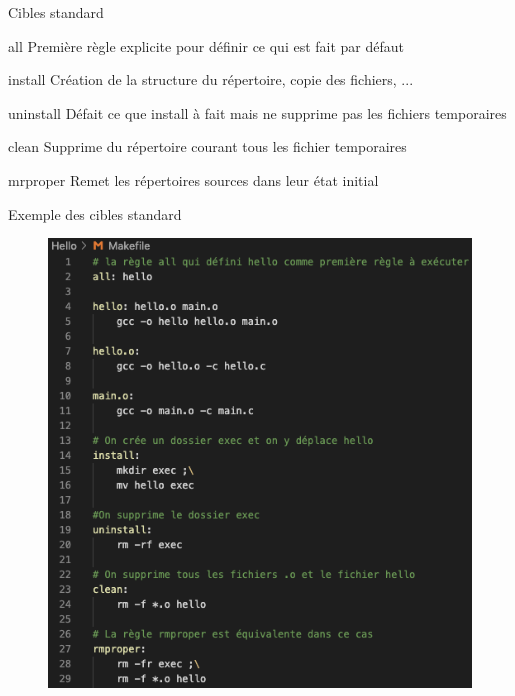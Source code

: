 \documentclass[10pt,xcolor=dvipsnames]{beamer}
\newcommand{\green}[1]{\textcolor{darkspringgreen}{#1}}
\begin{document}
\begin{frame}{Cibles standard}
\begin{exampleblock}{all}
    Première règle explicite pour définir ce qui est fait par défaut
\end{exampleblock}
    \begin{exampleblock}{install}
    Création de la structure du répertoire, copie des fichiers, ...
    \end{exampleblock}
    \begin{exampleblock}{uninstall}
    Défait ce que \green{install} à fait mais ne supprime pas les fichiers temporaires
    \end{exampleblock}
    \begin{exampleblock}{clean}
    Supprime du répertoire courant tous les fichier temporaires
    \end{exampleblock}
    \begin{exampleblock}{mrproper}
    Remet les répertoires sources dans leur état initial
    \end{exampleblock}
\end{frame}


\begin{frame}{Exemple des cibles standard}
\begin{figure}
    \centering
    \includegraphics[scale=0.4]{figures/makefile_hello_2.png}
    \label{fig:my_label}
\end{figure}
    
\end{frame}
\end{document}
